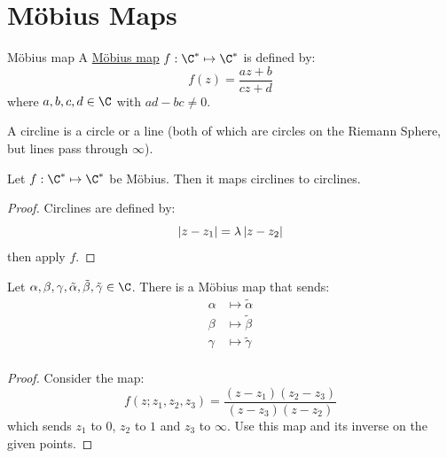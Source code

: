 \documentclass[../Main.tex]{subfiles}
\begin{document}
\section{M\"obius Maps}
\begin{definition}{M\"obius map}
    A \underline{M\"obius map} $f : \C^* \mapsto \C^*$ is defined by:
    \begin{equation*}
        f(z) = \frac{az + b}{cz + d}
    \end{equation*}
    where $a, b, c, d \in \C$ with $ad-bc\neq 0$.
\end{definition}
A circline is a circle or a line (both of which are circles on the Riemann Sphere, but lines pass through $\infty$).
\begin{proposition}
    Let $f : \C^* \mapsto \C^*$ be M\"obius. Then it maps circlines to circlines.
    \label{propMobiusCirclines}
\end{proposition}
\begin{proof}
    Circlines are defined by:
    \begin{equation*}
        \left|z - z_1\right| = \lambda \left|z - z_2\right|
    \end{equation*}
    then apply $f$.
\end{proof}
\begin{theorem}
    Let $\alpha, \beta, \gamma, \tilde{\alpha}, \tilde{\beta}, \tilde{\gamma} \in \C$. There is a M\"obius map that sends:
    \begin{align*}
        \alpha &\mapsto \tilde{\alpha} \\
        \beta &\mapsto \tilde{\beta} \\
        \gamma &\mapsto \tilde{\gamma} \\
    \end{align*}
    \label{thmMobius3Point}
\end{theorem}
\begin{proof}
    Consider the map:
    \begin{equation*}
        f(z;z_1, z_2, z_3) = \frac{(z - z_1)(z_2 - z_3)}{(z - z_3)(z - z_2)}
    \end{equation*}
    which sends $z_1$ to $0$, $z_2$ to $1$ and $z_3$ to $\infty$. Use this map and its inverse on the given points.
\end{proof}
\end{document}
